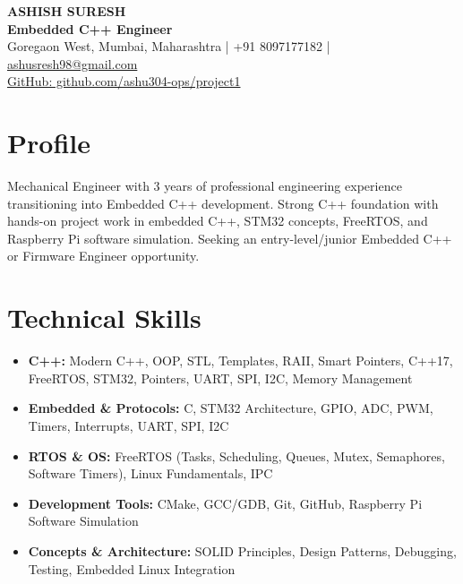 \documentclass[10pt,letterpaper]{article}
\begin{document}
\selectfont

\begin{center}
    {\huge \textbf{ASHISH SURESH}}\\
    \vspace{1mm}
    \textbf{Embedded C++ Engineer}\\
    Goregaon West, Mumbai, Maharashtra | +91 8097177182 | \href{mailto:ashusresh98@gmail.com}{ashusresh98@gmail.com}\\
    \href{https://github.com/ashu304-ops/project1}{GitHub: github.com/ashu304-ops/project1}
\end{center}

\vspace{-2mm}

\section*{Profile}
Mechanical Engineer with 3 years of professional engineering experience transitioning into Embedded C++ development. Strong C++ foundation with hands-on project work in embedded C++, STM32 concepts, FreeRTOS, and Raspberry Pi software simulation. Seeking an entry-level/junior Embedded C++ or Firmware Engineer opportunity.

\vspace{-2mm}

\section*{Technical Skills}
\begin{itemize}[leftmargin=*, itemsep=2pt, parsep=0pt]
    \item \textbf{C++:} Modern C++, OOP, STL, Templates, RAII, Smart Pointers, C++17, FreeRTOS, STM32, Pointers, UART, SPI, I2C, Memory Management
    \item \textbf{Embedded \& Protocols:} C, STM32 Architecture, GPIO, ADC, PWM, Timers, Interrupts, UART, SPI, I2C
    \item \textbf{RTOS \& OS:} FreeRTOS (Tasks, Scheduling, Queues, Mutex, Semaphores, Software Timers), Linux Fundamentals, IPC
    \item \textbf{Development Tools:} CMake, GCC/GDB, Git, GitHub, Raspberry Pi Software Simulation
    \item \textbf{Concepts \& Architecture:} SOLID Principles, Design Patterns, Debugging, Testing, Embedded Linux Integration
\end{itemize}
\end{document}
